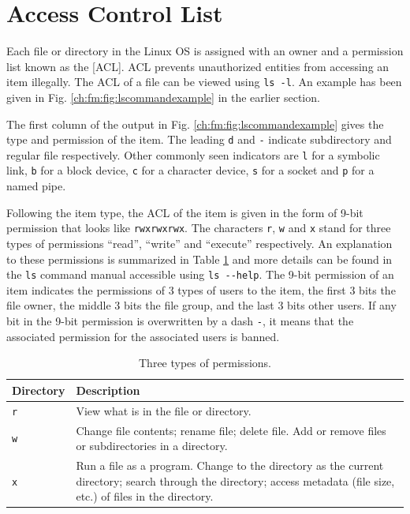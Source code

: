 \section{Access Control List} \label{ch:fm:sec:accesscontrollist}

Each file or directory in the Linux OS is assigned with an owner and a permission list known as the [ACL]. ACL prevents unauthorized entities from accessing an item illegally. The ACL of a file can be viewed using \verb|ls -l|. An example has been given in Fig. \ref{ch:fm:fig:lscommandexample} in the earlier section.

The first column of the output in Fig. \ref{ch:fm:fig:lscommandexample} gives the type and permission of the item. The leading \verb|d| and \verb|-| indicate subdirectory and regular file respectively. Other commonly seen indicators are \verb|l| for a symbolic link, \verb|b| for a block device, \verb|c| for a character device, \verb|s| for a socket and \verb|p| for a named pipe.

Following the item type, the ACL of the item is given in the form of 9-bit permission that looks like \verb|rwxrwxrwx|. The characters \verb|r|, \verb|w| and \verb|x| stand for three types of permissions ``read'', ``write'' and ``execute'' respectively. An explanation to these permissions is summarized in Table \ref{ch:fm:tab:threepermissions} and more details can be found in the \verb|ls| command manual accessible using \verb|ls --help|. The 9-bit permission of an item indicates the permissions of 3 types of users to the item, the first 3 bits the file owner, the middle 3 bits the file group, and the last 3 bits other users. If any bit in the 9-bit permission is overwritten by a dash \verb|-|, it means that the associated permission for the associated users is banned.

\begin{table}[!htb]
  \centering \caption{Three types of permissions.}\label{ch:fm:tab:threepermissions}
  \begin{tabularx}{\textwidth}{lX}
    \hline
    Directory & Description \\ \hline
    \verb|r| & View what is in the file or directory. \\ 
    \verb|w| & Change file contents; rename file; delete file. Add or remove files or subdirectories in a directory. \\ 
    \verb|x| & Run a file as a program. Change to the directory as the current directory; search through the directory; access metadata (file size, etc.) of files in the directory. \\
    \hline
  \end{tabularx}
\end{table}


